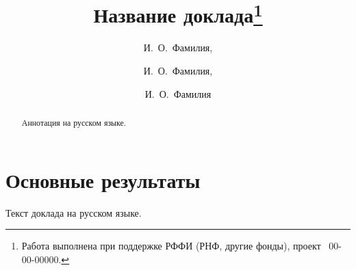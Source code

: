 \documentclass[12pt]{llncs}
\begin{document}

\title{Название доклада\thanks{Работа выполнена при поддержке РФФИ (РНФ, другие фонды), проект \textnumero~00-00-00000.}}
\author{И.~О.~Фамилия,
  \and
  И.~О.~Фамилия,
  \and
  И.~О.~Фамилия
} %

\maketitle

\begin{abstract}
Аннотация на русском языке.

\end{abstract}

\section{Основные результаты} %

Текст доклада на русском языке.
\end{document}
